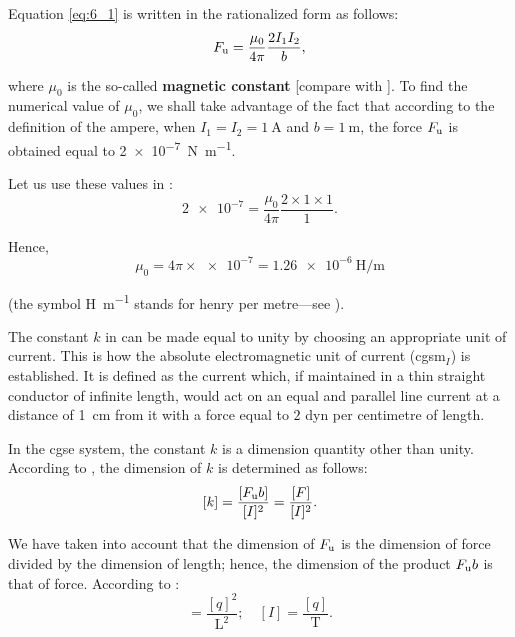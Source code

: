 Equation \eqref{eq:6_1} is written in the rationalized form as follows:
\begin{equation}\label{eq:6_2}
    F_{\text{u}} = \frac{\mu_0}{4\pi} \frac{2 I_1 I_2}{b},
\end{equation}

\noindent
where $\mu_0$ is the so-called \textbf{magnetic constant} [compare with ]. To find the numerical value of $\mu_0$, we shall take advantage of the fact that according to the definition of the ampere, when $I_1=I_2=\SI{1}{\ampere}$ and $b=\SI{1}{\metre}$, the force $F_{\text{u}}$ is obtained equal to \SI{2e-7}{\newton\per\metre}.

Let us use these values in :
\begin{equation*}
    \num{2e-7} = \frac{\mu_0}{4\pi} \frac{2\times 1\times 1}{1}.
\end{equation*}

\noindent
Hence,
\begin{equation}\label{eq:6_3}
    \mu_0 = 4 \pi \times \num{e-7} = \SI{1.26e-6}{\henry\per\metre}
\end{equation}

\noindent
(the symbol \si{\henry\per\metre} stands for henry per metre---see ).

The constant $k$ in  can be made equal to unity by choosing an appropriate unit of current. This is how the absolute electromagnetic unit of current (cgsm$_I$) is established. It is defined as the current which, if maintained in a thin straight conductor of infinite length, would act on an equal and parallel line current at a distance of \SI{1}{\centi\metre} from it with a force equal to $2$ dyn per centimetre of length.

In the cgse system, the constant $k$ is a dimension quantity other than unity. According to , the dimension of $k$ is determined as follows:
\begin{equation}\label{eq:6_4}
    [k] = \frac{[F_{\text{u}} b]}{[I]^2} = \frac{[F]}{[I]^2}.
\end{equation}

\noindent
We have taken into account that the dimension of $F_{\text{u}}$ is the dimension of force divided by the dimension of length; hence, the dimension of the product $F_{\text{u}}b$ is that of force. According to :
\begin{equation*}
    [F] = \frac{[q]^2}{\text{L}^2};\quad [I] = \frac{[q]}{\text{T}}.
\end{equation*}

